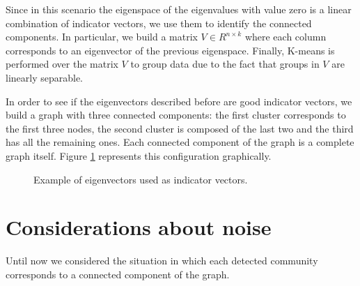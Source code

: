 \documentclass{article}
\begin{document}
Since in this scenario the eigenspace of the eigenvalues with value zero
is a linear combination of indicator vectors, we use them to identify the connected components.
In particular, we build a matrix $V \in \mathit{R}^{n \times k}$ where each column corresponds to
an eigenvector of the previous eigenspace.
Finally, K-means is performed over the matrix $V$ to group data due to the fact that groups in $V$
are linearly separable.

In order to see if the eigenvectors described before are good indicator vectors,
we build a graph with three connected components:
the first cluster corresponds to the first three nodes,
the second cluster is composed of the last two and the third has all the remaining ones.
Each connected component of the graph is a complete graph itself.
Figure \ref{figure:eivects} represents this configuration graphically.

\begin{figure}[hb]
    \hfill
    \hfill
    \hfill
    \hfill
    \caption{Example of eigenvectors used as indicator vectors.}%
    \label{figure:eivects}%
\end{figure}

\section{Considerations about noise} \label{section:noisecom}
Until now we considered the situation in which each detected community
corresponds to a connected component of the graph.
\end{document}
